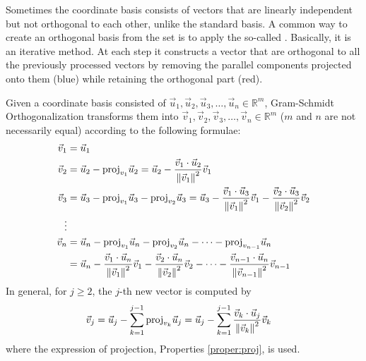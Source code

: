 Sometimes the coordinate basis consists of vectors that are linearly independent but not orthogonal to each other, unlike the standard basis. A common way to create an orthogonal basis from the set is to apply the so-called . Basically, it is an iterative method. At each step it constructs a vector that are orthogonal to all the previously processed vectors by removing the parallel components projected onto them (blue) while retaining the orthogonal part (red).
\begin{center}
\end{center}
\begin{defn}
\label{defn:GSorth}
Given a coordinate basis consisted of $\vec{u}_1, \vec{u}_2, \vec{u}_3, \ldots, \vec{u}_n \in \mathbb{R}^m$, Gram-Schmidt Orthogonalization transforms them into $\vec{v}_1, \vec{v}_2, \vec{v}_3, \ldots, \vec{v}_n \in \mathbb{R}^m$ ($m$ and $n$ are not necessarily equal) according to the following formulae:
\begin{align*}
\vec{v}_1 &= \vec{u}_1 \\
\vec{v}_2 &= \vec{u}_2 - \text{proj}_{v_1}\vec{u}_2 = \vec{u}_2 - \frac{\vec{v}_1 \cdot \vec{u}_2}{\norm{\vec{v}_1}^2} \vec{v}_1 \\
\vec{v}_3 &= \vec{u}_3 - \text{proj}_{v_1}\vec{u}_3 - \text{proj}_{v_2}\vec{u}_3 = \vec{u}_3 - \frac{\vec{v}_1 \cdot \vec{u}_3}{\norm{\vec{v}_1}^2} \vec{v}_1 - \frac{\vec{v}_2 \cdot \vec{u}_3}{\norm{\vec{v}_2}^2} \vec{v}_2 \\
\vdots \\
\vec{v}_n &= \vec{u}_n - \text{proj}_{v_1}\vec{u}_n - \text{proj}_{v_2}\vec{u}_n - \cdots - \text{proj}_{v_{n-1}}\vec{u}_n \\
&= \vec{u}_n - \frac{\vec{v}_1 \cdot \vec{u}_n}{\norm{\vec{v}_1}^2} \vec{v}_1 - \frac{\vec{v}_2 \cdot \vec{u}_n}{\norm{\vec{v}_2}^2} \vec{v}_2 - \cdots - \frac{\vec{v}_{n-1} \cdot \vec{u}_n}{\norm{\vec{v}_{n-1}}^2} \vec{v}_{n-1}
\end{align*}
In general, for $j \geq 2$, the $j$-th new vector is computed by
\begin{align*}
\vec{v}_j &= \vec{u}_j - \sum_{k=1}^{j-1}\text{proj}_{v_k}\vec{u}_j  = \vec{u}_j - \sum_{k=1}^{j-1}\frac{\vec{v}_k \cdot \vec{u}_j}{\norm{\vec{v}_k}^2} \vec{v}_k
\end{align*}
where the expression of projection, Properties \ref{proper:proj}, is used.
\end{defn}
